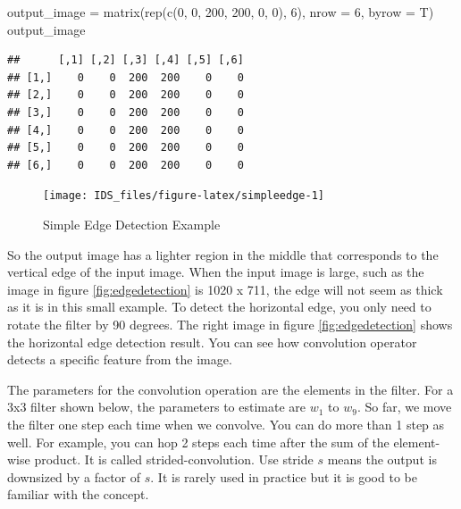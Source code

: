 \documentclass[
  12pt,
]{krantz}
\makeatletter
\newenvironment{Shaded}{\begin{snugshade}}{\end{snugshade}}
\newcommand{\AttributeTok}[1]{\textcolor[rgb]{0.61,0.61,0.61}{#1}}
\newcommand{\DecValTok}[1]{\textcolor[rgb]{0.06,0.06,0.06}{#1}}
\newcommand{\FunctionTok}[1]{\textcolor[rgb]{0,0,0}{#1}}
\newcommand{\NormalTok}[1]{#1}
\newcommand{\OtherTok}[1]{\textcolor[rgb]{0.37,0.37,0.37}{#1}}
\newenvironment{kframe}{%
\medskip{}
\setlength{\fboxsep}{.8em}
 \def\at@end@of@kframe{}%
 \ifinner\ifhmode%
  \def\at@end@of@kframe{\end{minipage}}%
  \begin{minipage}{\columnwidth}%
 \fi\fi%
 \def\FrameCommand##1{\hskip\@totalleftmargin \hskip-\fboxsep
 \colorbox{shadecolor}{##1}\hskip-\fboxsep
     \hskip-\linewidth \hskip-\@totalleftmargin \hskip\columnwidth}%
 \MakeFramed {\advance\hsize-\width
   \@totalleftmargin\z@ \linewidth\hsize
   \@setminipage}}%
 {\par\unskip\endMakeFramed%
 \at@end@of@kframe}
\renewenvironment{Shaded}{\begin{kframe}}{\end{kframe}}
\makeatother
\begin{document}
\begin{Shaded}
\begin{Highlighting}[]
\NormalTok{output\_image }\OtherTok{=} \FunctionTok{matrix}\NormalTok{(}\FunctionTok{rep}\NormalTok{(}\FunctionTok{c}\NormalTok{(}\DecValTok{0}\NormalTok{, }\DecValTok{0}\NormalTok{, }\DecValTok{200}\NormalTok{, }\DecValTok{200}\NormalTok{, }\DecValTok{0}\NormalTok{, }\DecValTok{0}\NormalTok{), }\DecValTok{6}\NormalTok{), }
                      \AttributeTok{nrow =} \DecValTok{6}\NormalTok{, }\AttributeTok{byrow =}\NormalTok{ T)}
\NormalTok{output\_image}
\end{Highlighting}
\end{Shaded}

\begin{verbatim}
##      [,1] [,2] [,3] [,4] [,5] [,6]
## [1,]    0    0  200  200    0    0
## [2,]    0    0  200  200    0    0
## [3,]    0    0  200  200    0    0
## [4,]    0    0  200  200    0    0
## [5,]    0    0  200  200    0    0
## [6,]    0    0  200  200    0    0
\end{verbatim}

\begin{figure}

{\centering \texttt{[image: IDS\_files/figure-latex/simpleedge-1]} 

}

\caption{Simple Edge Detection Example}\label{fig:simpleedge}
\end{figure}

So the output image has a lighter region in the middle that corresponds to the vertical edge of the input image. When the input image is large, such as the image in figure \ref{fig:edgedetection} is 1020 x 711, the edge will not seem as thick as it is in this small example. To detect the horizontal edge, you only need to rotate the filter by 90 degrees. The right image in figure \ref{fig:edgedetection} shows the horizontal edge detection result. You can see how convolution operator detects a specific feature from the image.

The parameters for the convolution operation are the elements in the filter. For a 3x3 filter shown below, the parameters to estimate are \(w_1\) to \(w_9\). So far, we move the filter one step each time when we convolve. You can do more than 1 step as well. For example, you can hop 2 steps each time after the sum of the element-wise product. It is called strided-convolution. Use stride \(s\) means the output is downsized by a factor of \(s\). It is rarely used in practice but it is good to be familiar with the concept.
\end{document}
